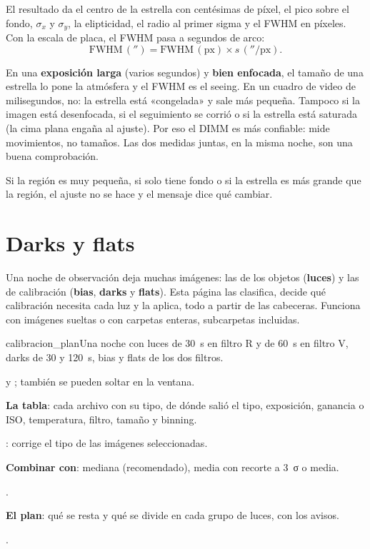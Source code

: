 El resultado da el centro de la estrella con centésimas de píxel, el pico sobre el fondo, $\sigma_x$ y $\sigma_y$, la
elipticidad, el radio al primer sigma y el FWHM en píxeles. Con la escala de placa, el FWHM pasa a segundos de arco:
\[
\text{FWHM}\,('') = \text{FWHM}\,(\text{px}) \times s\,(''/\text{px}) .
\]

\begin{cuidado}
En una \textbf{exposición larga} (varios segundos) y \textbf{bien enfocada}, el tamaño de una estrella lo pone la
atmósfera y el FWHM es el seeing. En un cuadro de video de milisegundos, no: la estrella está «congelada» y sale más
pequeña. Tampoco si la imagen está desenfocada, si el seguimiento se corrió o si la estrella está saturada (la cima
plana engaña al ajuste). Por eso el DIMM es más confiable: mide movimientos, no tamaños. Las dos medidas juntas, en la
misma noche, son una buena comprobación.
\end{cuidado}

Si la región es muy pequeña, si solo tiene fondo o si la estrella es más grande que la región, el ajuste no se hace y el
mensaje dice qué cambiar.

\section{Darks y flats}\label{sec:calibracion_app}

Una noche de observación deja muchas imágenes: las de los objetos (\textbf{luces}) y las de calibración (\textbf{bias},
\textbf{darks} y \textbf{flats}). Esta página las clasifica, decide qué calibración necesita cada luz y la aplica, todo a
partir de las cabeceras. Funciona con imágenes sueltas o con carpetas enteras, subcarpetas incluidas.

\begin{capturam}{calibracion_plan}{Una noche con luces de 30~s en filtro R y de 60~s en filtro V, darks de 30 y 120~s,
bias y flats de los dos filtros.}
\item {} y ; también se pueden soltar en la ventana.
\item \textbf{La tabla}: cada archivo con su tipo, de dónde salió el tipo, exposición, ganancia o ISO, temperatura,
filtro, tamaño y binning.
\item {}: corrige el tipo de las imágenes seleccionadas.
\item \textbf{Combinar con}: mediana (recomendado), media con recorte a 3~σ o media.
\item {}.
\item \textbf{El plan}: qué se resta y qué se divide en cada grupo de luces, con los avisos.
\item {}.
\end{capturam}

